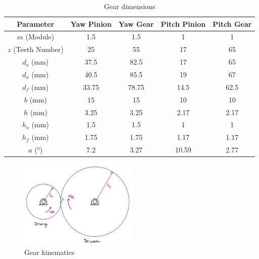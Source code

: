 \documentclass[12pt]{article}
\begin{document}
\begin{table}[H]
\centering
\caption{Gear dimensions}
\begin{tabular}{|c|c|c|c|c|}
\hline
\textbf{Parameter} & \textbf{Yaw Pinion} & \textbf{Yaw Gear} & \textbf{Pitch Pinion} & \textbf{Pitch Gear} \\ \hline
$m$ (Module)       & 1.5                 & 1.5               & 1                     & 1                   \\ \hline
$z$ (Teeth Number) & 25                  & 55                & 17                    & 65                  \\ \hline
$d_o$ (mm)         & 37.5                & 82.5              & 17                    & 65                  \\ \hline
$d_a$ (mm)         & 40.5                & 85.5              & 19                    & 67                  \\ \hline
$d_f$ (mm)         & 33.75               & 78.75             & 14.5                  & 62.5                \\ \hline
$b$ (mm)           & 15                  & 15                & 10                    & 10                  \\ \hline
$h$ (mm)           & 3.25                & 3.25              & 2.17                  & 2.17                \\ \hline
$h_a$ (mm)         & 1.5                 & 1.5               & 1                     & 1                   \\ \hline
$h_f$ (mm)         & 1.75                & 1.75              & 1.17                  & 1.17                \\ \hline
$a$ (°)            & 7.2                 & 3.27              & 10.59                 & 2.77                \\ \hline
\end{tabular}
\label{table:gear_dimensions}
\end{table}

\begin{figure}[h!]
    \centering
    \includegraphics[width=0.5\textwidth]{fig12 gear kin.png} 
    \caption{Gear kinematics} 
    \label{Gear Kinematics} 
\end{figure}
\end{document}

